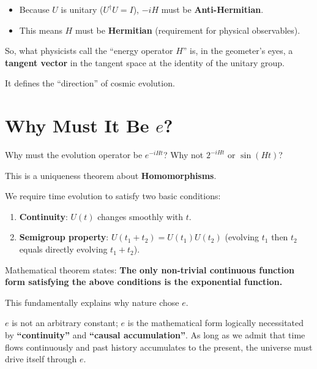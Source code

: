 \begin{itemize}
\item Because $U$ is unitary ($U^\dagger U = I$), $-iH$ must be \textbf{Anti-Hermitian}.

\item This means $H$ must be \textbf{Hermitian} (requirement for physical observables).
\end{itemize}

So, what physicists call the ``energy operator $H$'' is, in the geometer's eyes, a \textbf{tangent vector} in the tangent space at the identity of the unitary group.

It defines the ``direction'' of cosmic evolution.

\section{Why Must It Be $e$?}

Why must the evolution operator be $e^{-iHt}$? Why not $2^{-iHt}$ or $\sin(Ht)$?

This is a uniqueness theorem about \textbf{Homomorphisms}.

We require time evolution to satisfy two basic conditions:

\begin{enumerate}
\item \textbf{Continuity}: $U(t)$ changes smoothly with $t$.

\item \textbf{Semigroup property}: $U(t_1 + t_2) = U(t_1) U(t_2)$ (evolving $t_1$ then $t_2$ equals directly evolving $t_1+t_2$).
\end{enumerate}

Mathematical theorem states: \textbf{The only non-trivial continuous function form satisfying the above conditions is the exponential function.}

This fundamentally explains why nature chose $e$.

$e$ is not an arbitrary constant; $e$ is the mathematical form logically necessitated by \textbf{``continuity''} and \textbf{``causal accumulation''}. As long as we admit that time flows continuously and past history accumulates to the present, the universe must drive itself through $e$.

